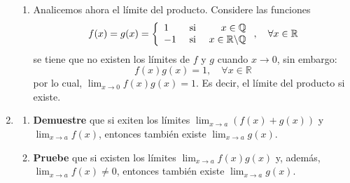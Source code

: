 \documentclass[12pt]{article}
\begin{document}
\begin{enumerate}
\begin{sol}
\begin{enumerate}
            \item Analicemos ahora el límite del producto. Considere las funciones
            \begin{equation*}
                f(x)=g(x)=\left\{
                    \begin{array}{lcr}
                        1 & \textup{ si } & x\in\mathbb{Q}\\
                        -1 & \textup{ si } & x\in\mathbb{R}\backslash\mathbb{Q} \\
                    \end{array}
                \right.,\quad\forall x\in\mathbb{R}
            \end{equation*}
            se tiene que no existen los límites de $f$ y $g$ cuando $x\rightarrow 0$, sin embargo:
            \begin{equation*}
                f(x)g(x)=1,\quad\forall x\in\mathbb{R}
            \end{equation*}
            por lo cual, $\lim_{x\rightarrow 0}f(x)g(x)=1$. Es decir, el límite del producto si existe.
        \end{enumerate}
    \end{sol}

    \item \begin{enumerate}
        \item \textbf{Demuestre} que si exiten los límites $\lim_{x\rightarrow a}(f(x)+g(x))$ y $\lim_{x\rightarrow a}f(x)$, entonces también existe $\lim_{x\rightarrow a}g(x)$.
        \item \textbf{Pruebe} que si existen los límites $\lim_{x\rightarrow a}f(x)g(x)$ y, además, $\lim_{x\rightarrow a}f(x)\neq 0$, entonces también existe $\lim_{x\rightarrow a}g(x)$.
    \end{enumerate}


\end{enumerate}
\end{document}
